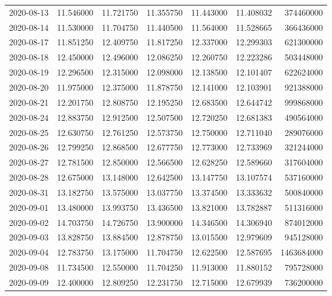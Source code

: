 \begin{tabular}{lrrrrrr}
2020-08-13 &   11.546000 &   11.721750 &   11.355750 &   11.443000 &   11.408032 &   374460000 \\
2020-08-14 &   11.530000 &   11.704750 &   11.440500 &   11.564000 &   11.528665 &   366436000 \\
2020-08-17 &   11.851250 &   12.409750 &   11.817250 &   12.337000 &   12.299303 &   621300000 \\
2020-08-18 &   12.450000 &   12.496000 &   12.086250 &   12.260750 &   12.223286 &   503448000 \\
2020-08-19 &   12.296500 &   12.315000 &   12.098000 &   12.138500 &   12.101407 &   622624000 \\
2020-08-20 &   11.975000 &   12.375000 &   11.878750 &   12.141000 &   12.103901 &   921388000 \\
2020-08-21 &   12.201750 &   12.808750 &   12.195250 &   12.683500 &   12.644742 &   999868000 \\
2020-08-24 &   12.883750 &   12.912500 &   12.507500 &   12.720250 &   12.681383 &   490564000 \\
2020-08-25 &   12.630750 &   12.761250 &   12.573750 &   12.750000 &   12.711040 &   289076000 \\
2020-08-26 &   12.799250 &   12.868500 &   12.677750 &   12.773000 &   12.733969 &   321244000 \\
2020-08-27 &   12.781500 &   12.850000 &   12.566500 &   12.628250 &   12.589660 &   317604000 \\
2020-08-28 &   12.675000 &   13.148000 &   12.642500 &   13.147750 &   13.107574 &   537160000 \\
2020-08-31 &   13.182750 &   13.575000 &   13.037750 &   13.374500 &   13.333632 &   500840000 \\
2020-09-01 &   13.480000 &   13.993750 &   13.436500 &   13.821000 &   13.782887 &   511316000 \\
2020-09-02 &   14.703750 &   14.726750 &   13.900000 &   14.346500 &   14.306940 &   874012000 \\
2020-09-03 &   13.828750 &   13.884500 &   12.878750 &   13.015500 &   12.979609 &   945128000 \\
2020-09-04 &   12.783750 &   13.175000 &   11.704750 &   12.622500 &   12.587695 &  1463684000 \\
2020-09-08 &   11.734500 &   12.550000 &   11.704250 &   11.913000 &   11.880152 &   795728000 \\
2020-09-09 &   12.400000 &   12.809250 &   12.231750 &   12.715000 &   12.679939 &   736200000 \\

\end{tabular}
